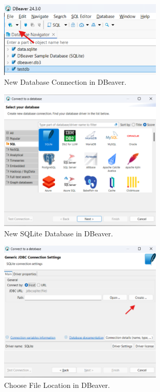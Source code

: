 \documentclass[a4paper,11pt,oneside]{article}
\begin{document}
\begin{sloppypar}
\begin{figure}[!htb]
  \centering
  \includegraphics[width=0.7\textwidth]{dbeaver/new_database_connection.png}
  \caption{New Database Connection in DBeaver.}
  \label{fig:new_database_connection}
\end{figure}

\begin{figure}[!htb]
  \centering
  \includegraphics[width=0.7\textwidth]{dbeaver/new_database_sqlite.png}
  \caption{New SQLite Database in DBeaver.}
  \label{fig:new_database_sqlite}
\end{figure}

\begin{figure}[!htb]
  \centering
  \includegraphics[width=0.7\textwidth]{dbeaver/create_choose_file_location.png}
  \caption{Choose File Location in DBeaver.}
  \label{fig:create_choose_file_location}
\end{figure}


\end{sloppypar}
\end{document}
